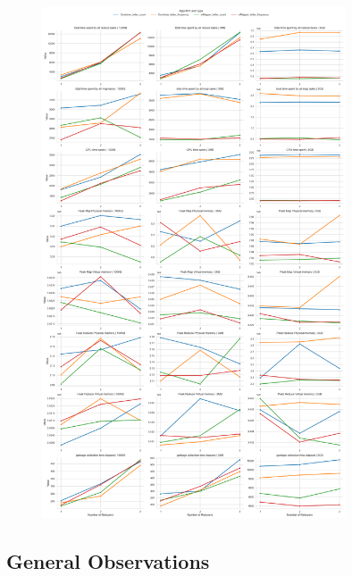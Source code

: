 \begin{figure}[h!]
    \centering
    \includegraphics[width=0.8\textwidth]{media/performance.png}
\end{figure}

\subsection{General Observations}

